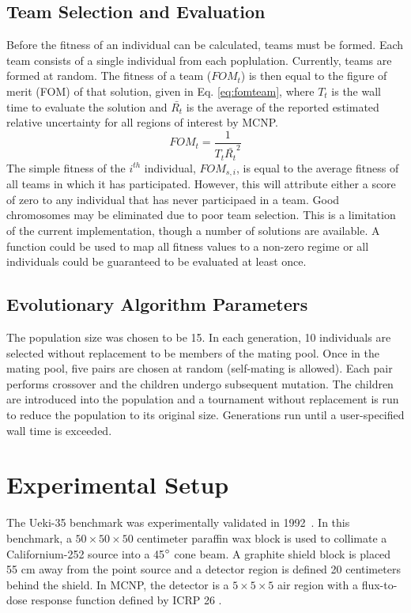 \documentclass[conference]{IEEEtran}
\begin{document}
\subsection{Team Selection and Evaluation}
Before the fitness of an individual can be calculated, teams must be formed. Each team consists of a single individual from each poplulation. Currently, teams are formed at random. The fitness of a team ($FOM_t$) is then equal to the figure of merit (FOM) of that solution, given in Eq. \ref{eq:fomteam}, where $T_t$ is the wall time to evaluate the solution and $\bar{R_t}$ is the average of the reported estimated relative uncertainty for all regions of interest by MCNP.
\begin{equation} \label{eq:fomteam}
FOM_{t} = \frac{1}{T_t\bar{R_t}^2}
\end{equation}
The simple fitness of the $i^{th}$ individual, $FOM_{s,i}$, is equal to the average fitness of all teams in which it has participated. However, this will attribute either a score of zero to any individual that has never participaed in a team. Good chromosomes may be eliminated due to poor team selection. This is a limitation of the current implementation, though a number of solutions are available. A function could be used to map all fitness values to a non-zero regime or all individuals could be guaranteed to be evaluated at least once.

\subsection{Evolutionary Algorithm Parameters}
The population size was chosen to be 15. In each generation, 10 individuals are selected without replacement to be members of the mating pool. Once in the mating pool, five pairs are chosen at random (self-mating is allowed). Each pair performs crossover and the children undergo subsequent mutation. The children are introduced into the population and a tournament without replacement is run to reduce the population to its original size. Generations run until a user-specified wall time is exceeded. 

\section{Experimental Setup}
The Ueki-35 benchmark was experimentally validated in 1992~\cite{ref:Ueki1992}. In this benchmark, a $50 \times 50 \times 50$ centimeter paraffin wax block is used to collimate a Californium-252 source into a 45$\degree$ cone beam. A graphite shield block is placed 55 cm away from the point source and a detector region is defined 20 centimeters behind the shield. In MCNP, the detector is a $5 \times 5 \times 5$ air region with a flux-to-dose response function defined by ICRP 26 \cite{ref:ICRP1977}.
\end{document}
